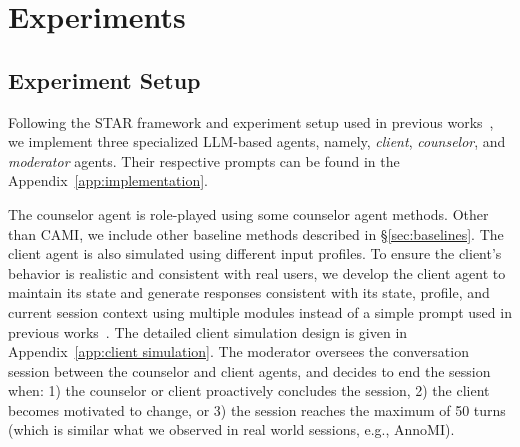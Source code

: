 \section{Experiments}

\subsection{Experiment Setup}
\label{sec:experiment setting}

Following the STAR framework and experiment setup used in previous works~\citep{tu2024towards,chiu2024computational,yosef2024assessing,wu2023towards}, we implement three specialized LLM-based agents, namely, {\em client}, {\em counselor}, and {\em moderator} agents. Their respective prompts can be found in the Appendix~\ref{app:implementation}.

The counselor agent is role-played using some counselor agent methods. Other than CAMI, we include other baseline methods described in §\ref{sec:baselines}.  The client agent is also simulated using different input profiles. To ensure the client's behavior is realistic and consistent with real users, we develop the client agent to maintain its state and generate responses consistent with its state, profile, and current session context using multiple modules instead of a simple prompt used in previous works~\cite{chiu2024computational,yosef2024assessing,wu2023towards}. The detailed client simulation design is given in Appendix~\ref{app:client simulation}. 
The moderator oversees the conversation session between the counselor and client agents, and decides to end the session when: 1) the counselor or client proactively concludes the session, 2) the client becomes motivated to change, or 3) the session reaches the maximum of 50 turns (which is similar what we observed in real world sessions, e.g., AnnoMI).

